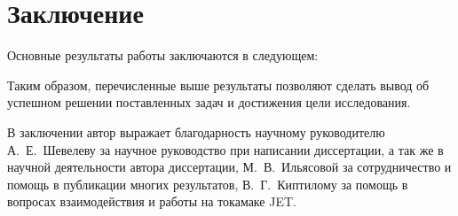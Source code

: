 \chapter*{Заключение}                       %


Основные результаты работы заключаются в следующем:



Таким образом, перечисленные выше результаты позволяют сделать вывод об успешном решении поставленных задач и достижения цели исследования.

В заключении автор выражает благодарность научному руководителю А.~Е.~Шевелеву за научное руководство при написании диссертации, а так же в научной деятельности автора диссертации, М.~В.~Ильясовой за сотрудничество и помощь в публикации многих результатов, В.~Г.~Киптилому за помощь в вопросах взаимодействия и работы на токамаке JET.

